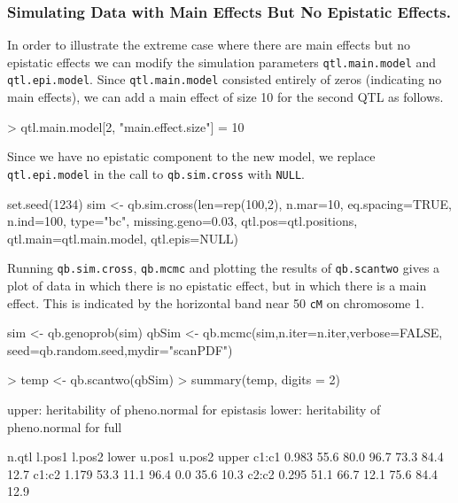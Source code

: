 \documentclass[12pt]{article}
\begin{document}
\subsubsection{Simulating Data with Main Effects But No Epistatic 
Effects.}
In order to illustrate the extreme case where there are main effects 
but no epistatic effects we can modify the simulation parameters 
{\tt qtl.main.model} and {\tt qtl.epi.model}.  Since 
{\tt qtl.main.model} consisted entirely of zeros (indicating no main 
effects), we can add a main effect of size 10 for the second QTL as 
follows.
\begin{Schunk}
\begin{Sinput}
> qtl.main.model[2, "main.effect.size"] = 10
\end{Sinput}
\end{Schunk}
Since we have no epistatic component to the new model, we replace 
{\tt qtl.epi.model} in the call to {\tt qb.sim.cross} with {\tt NULL}.
\begin{Schunk}
\begin{Sinput}
set.seed(1234)
sim <- qb.sim.cross(len=rep(100,2), n.mar=10, eq.spacing=TRUE, 
  n.ind=100, type="bc",
  missing.geno=0.03, qtl.pos=qtl.positions, 
  qtl.main=qtl.main.model, qtl.epis=NULL) 
\end{Sinput}
\end{Schunk}
Running {\tt qb.sim.cross}, {\tt qb.mcmc} and plotting the results of 
{\tt qb.scantwo} gives a plot of data in which there is no 
epistatic effect, but in which there is a main effect.  This is indicated
by the horizontal band near 50 {\tt cM} on chromosome 1.
\begin{Schunk}
\begin{Sinput}
sim <- qb.genoprob(sim)
qbSim <- qb.mcmc(sim,n.iter=n.iter,verbose=FALSE,
                   seed=qb.random.seed,mydir="scanPDF")
\end{Sinput}
\end{Schunk}
\begin{Schunk}
\begin{Sinput}
> temp <- qb.scantwo(qbSim)
> summary(temp, digits = 2)
\end{Sinput}
\begin{Soutput}
upper: heritability of pheno.normal for epistasis
lower: heritability of pheno.normal for full 

      n.qtl l.pos1 l.pos2 lower u.pos1 u.pos2 upper
c1:c1 0.983   55.6   80.0  96.7   73.3   84.4  12.7
c1:c2 1.179   53.3   11.1  96.4    0.0   35.6  10.3
c2:c2 0.295   51.1   66.7  12.1   75.6   84.4  12.9
\end{Soutput}
\end{Schunk}
\end{document}
